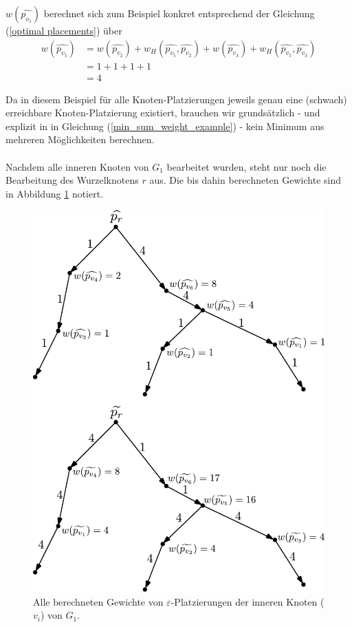 \documentclass[a4paper, 12pt, twoside]{article}
\theoremstyle{Format1} %
\begin{document}
$w(\widehat{p_{v_5}})$ berechnet sich zum Beispiel konkret entsprechend der Gleichung (\ref{optimal placements}) über
\begin{equation} \label{min_sum_weight_example}
	\begin{split}
		w(\widehat{p_{v_5}}) & = w(\widehat{p_{v_2}}) + w_H(\widehat{p_{v_5}}, \widehat{p_{v_2}}) + w(\widehat{p_{v_3}}) + w_H(\widehat{p_{v_5}}, \widehat{p_{v_3}}) \\
		& = 1 + 1 + 1 + 1 \\
		& = 4
	\end{split}
\end{equation}

Da in diesem Beispiel für alle Knoten-Platzierungen jeweils genau eine (schwach) erreichbare Knoten-Platzierung existiert, brauchen wir grundsätzlich - und explizit in in Gleichung (\ref{min_sum_weight_example}) -
kein Minimum aus mehreren Möglichkeiten berechnen.
\\
\\
Nachdem alle inneren Knoten von $G_1$ bearbeitet wurden, steht nur noch die Bearbeitung des Wurzelknotens $r$ aus.
Die bis dahin berechneten Gewichte sind in Abbildung \ref{min_sum_tree_h_1} notiert.

\begin{figure}[H]
	\centering
	\includegraphics[width=.8\textwidth]{min_sum_tree_h_1.pdf}
	\caption{
		Alle berechneten Gewichte von $\varepsilon$-Platzierungen der inneren Knoten ($v_i$) von $G_1$.
	}
    \label{min_sum_tree_h_1}
\end{figure}
\end{document}
